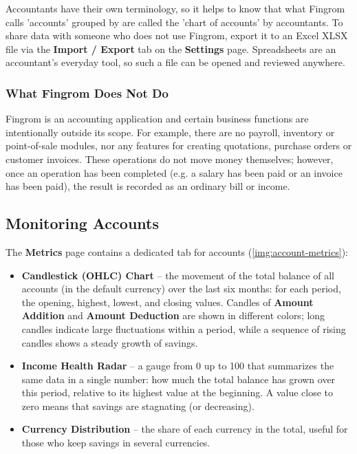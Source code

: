 Accountants have their own terminology, so it helps to know that what Fingrom calls
'accounts' grouped by \q{/} are called the 'chart of accounts' by accountants. To share data
with someone who does not use Fingrom, export it to an Excel XLSX file via the
\textbf{Import / Export} tab on the \textbf{Settings} page. Spreadsheets are an accountant's
everyday tool, so such a file can be opened and reviewed anywhere.


\subsubsection{What Fingrom Does Not Do}

Fingrom is an accounting application and certain business functions are intentionally outside
its scope. For example, there are no payroll, inventory or point-of-sale modules, nor any
features for creating quotations, purchase orders or customer invoices. These operations do
not move money themselves; however, once an operation has been completed (e.g. a salary has
been paid or an invoice has been paid), the result is recorded as an ordinary bill or income.


\subsection{Monitoring Accounts}

The \textbf{Metrics} page contains a dedicated tab for accounts (\cref{img:account-metrics}):


\begin{itemize}
  \item \textbf{Candlestick (OHLC) Chart} -- the movement of the total balance of all
  accounts (in the default currency) over the last six months: for each period, the opening,
  highest, lowest, and closing values. Candles of \textbf{Amount Addition} and
  \textbf{Amount Deduction} are shown in different colors; long candles indicate large
  fluctuations within a period, while a sequence of rising candles shows a steady growth of
  savings.
  \item \textbf{Income Health Radar} -- a gauge from 0 up to 100 that summarizes the same
  data in a single number: how much the total balance has grown over this period, relative to
  its highest value at the beginning. A value close to zero means that savings are stagnating
  (or decreasing).
  \item \textbf{Currency Distribution} -- the share of each currency in the total, useful for
  those who keep savings in several currencies.
\end{itemize}


